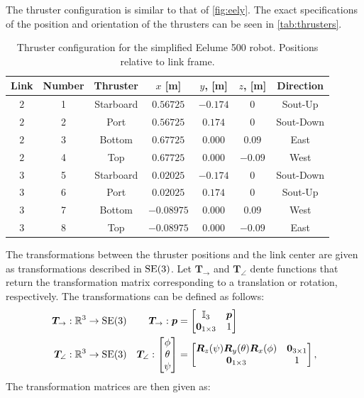 The thruster configuration is similar to that of \autoref{fig:eely}. The exact
specifications of the position and orientation of the thrusters can be seen in
\autoref{tab:thrusters}.

\begin{table}[h]
    \centering
    \begin{tabular}{|c|c|c|c|c|c|c|}
        \hline
        Link & Number & Thruster & $x$ [m] & $y$, [m] & $z$, [m] & Direction \\ \hline
        $2$ & 1 & Starboard & $0.56725$ & $-0.174$ & $0$ & Sout-Up \\
        $2$ & 2 & Port & $0.56725$ & $0.174$ & $0$ & Sout-Down \\
        $2$ & 3 & Bottom & $0.67725$ & $0.000$ & $0.09$ & East \\
        $2$ & 4 & Top & $0.67725$ & $0.000$ & $-0.09$ & West \\ \hline
        $3$ & 5 & Starboard & $0.02025$ & $-0.174$ & $0$ & Sout-Down \\
        $3$ & 6 & Port & $0.02025$ & $0.174$ & $0$ & Sout-Up \\
        $3$ & 7 & Bottom & $-0.08975$ & $0.000$ & $0.09$ & West \\
        $3$ & 8 & Top & $-0.08975$ & $0.000$ & $-0.09$ & East \\
        \hline
    \end{tabular}
    \caption{Thruster configuration for the simplified Eelume 500 robot. Positions relative to link frame.}
    \label{tab:thrusters}
\end{table}

The transformations between the thruster positions and the link center are given
as transformations described in $\operatorname{SE}(3)$. Let $\bm{T}_{\rightarrow}$ and $\bm{T}_{\angle}$
dente functions that return the transformation matrix corresponding to a translation
or rotation, respectively. The transformations can be defined as follows:
\begin{subequations}
\begin{align}
    \bm{T}_{\rightarrow} : \mathbb{R}^3 &\to \operatorname{SE}(3) 
    &\bm{T}_{\rightarrow} :\bm{p} &= \begin{bmatrix} \mathbb{I}_3 & \bm{p} \\ \bm{0}_{1\times3} & 1 \end{bmatrix} \\
    \bm{T}_{\angle} : \mathbb{R}^3 &\to \operatorname{SE}(3)
    &\bm{T}_{\angle} : \begin{bmatrix}\phi \\ \theta \\ \psi \end{bmatrix} &= \begin{bmatrix}
        \bm{R}_z(\psi) \bm{R}_y(\theta) \bm{R}_x(\phi) & \bm{0}_{3\times1} \\
            \bm{0}_{1\times3} & 1
    \end{bmatrix},
\end{align}
\end{subequations}
The transformation matrices are then given as:

